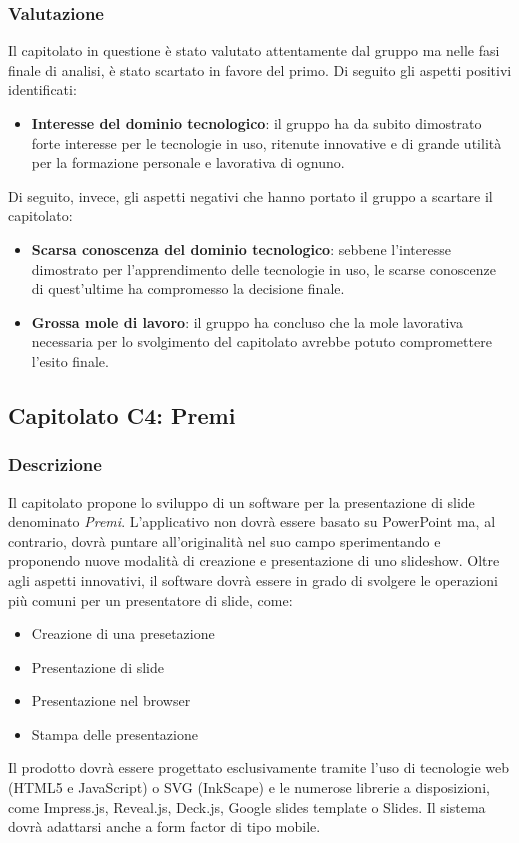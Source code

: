\subsubsection{Valutazione}
Il capitolato in questione è stato valutato attentamente dal gruppo ma nelle fasi finale di analisi, è stato scartato in favore del primo. Di seguito gli aspetti positivi identificati:
\begin{itemize}
\item \textbf{Interesse del dominio tecnologico}: il gruppo ha da subito dimostrato forte interesse per le tecnologie in uso, ritenute innovative e di grande utilità per la formazione personale e lavorativa di ognuno.
\end{itemize}
Di seguito, invece, gli aspetti negativi che hanno portato il gruppo a scartare il capitolato:
\begin{itemize}
\item \textbf{Scarsa conoscenza del dominio tecnologico}: sebbene l'interesse dimostrato per l'apprendimento delle tecnologie in uso, le scarse conoscenze di quest'ultime ha compromesso la decisione finale.
\item \textbf{Grossa mole di lavoro}: il gruppo ha concluso che la mole lavorativa necessaria per lo svolgimento del capitolato avrebbe potuto compromettere l'esito finale.
\end{itemize}


\subsection{Capitolato C4: Premi}

\subsubsection{Descrizione}
Il capitolato propone lo sviluppo di un software per la presentazione di slide denominato \emph{Premi}. L'applicativo non dovrà essere basato su PowerPoint ma, al contrario, dovrà puntare all'originalità nel suo campo sperimentando e proponendo nuove modalità di creazione e presentazione di uno slideshow. Oltre agli aspetti innovativi, il software dovrà essere in grado di svolgere le operazioni più comuni per un presentatore di slide, come:
\begin{itemize}
\item Creazione di una presetazione
\item Presentazione di slide
\item Presentazione nel browser
\item Stampa delle presentazione
\end{itemize}
Il prodotto dovrà essere progettato esclusivamente tramite l'uso di tecnologie web (HTML5 e JavaScript) o SVG (InkScape) e le numerose librerie a disposizioni, come Impress.js, Reveal.js, Deck.js, Google slides template o Slides. Il sistema dovrà adattarsi anche a form factor di tipo mobile.

